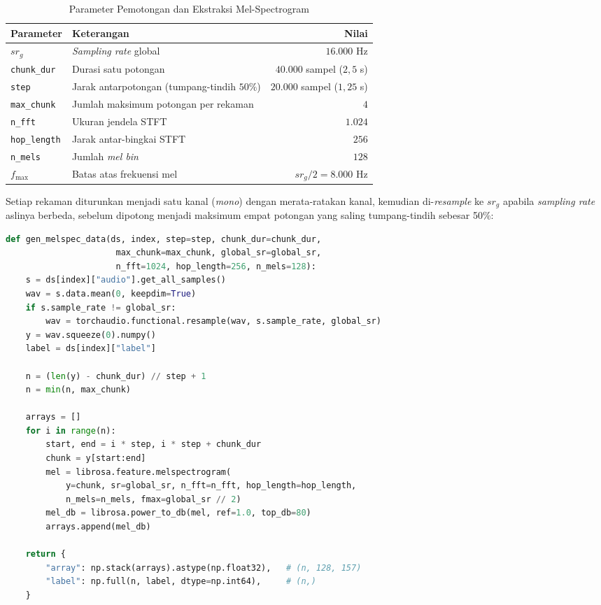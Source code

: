 \begin{table}[htbp]
  \centering
  \caption{Parameter Pemotongan dan Ekstraksi Mel-Spectrogram}
  \label{tab:parameter-pemotongan}
  \begin{tabular}{@{}llr@{}}
    \toprule
    \textbf{Parameter} & \textbf{Keterangan} & \textbf{Nilai} \\
    \midrule
    $sr_g$ & \textit{Sampling rate} global & $16.000$ Hz \\
    \texttt{chunk\_dur} & Durasi satu potongan & $40.000$ sampel ($2{,}5$ s) \\
    \texttt{step} & Jarak antarpotongan (tumpang-tindih $50\%$) & $20.000$ sampel ($1{,}25$ s) \\
    \texttt{max\_chunk} & Jumlah maksimum potongan per rekaman & $4$ \\
    \texttt{n\_fft} & Ukuran jendela STFT & $1.024$ \\
    \texttt{hop\_length} & Jarak antar-bingkai STFT & $256$ \\
    \texttt{n\_mels} & Jumlah \textit{mel bin} & $128$ \\
    $f_{\max}$ & Batas atas frekuensi mel & $sr_g/2 = 8.000$ Hz \\
    \bottomrule
  \end{tabular}
\end{table}

Setiap rekaman diturunkan menjadi satu kanal (\textit{mono}) dengan merata-ratakan
kanal, kemudian di-\textit{resample} ke $sr_g$ apabila \textit{sampling rate}
aslinya berbeda, sebelum dipotong menjadi maksimum empat potongan yang saling
tumpang-tindih sebesar 50\%:

\begin{lstlisting}[language=Python, caption={Fungsi ekstraksi mel-spectrogram per potongan}, label={lst:gen-melspec}]
def gen_melspec_data(ds, index, step=step, chunk_dur=chunk_dur,
                      max_chunk=max_chunk, global_sr=global_sr,
                      n_fft=1024, hop_length=256, n_mels=128):
    s = ds[index]["audio"].get_all_samples()
    wav = s.data.mean(0, keepdim=True)
    if s.sample_rate != global_sr:
        wav = torchaudio.functional.resample(wav, s.sample_rate, global_sr)
    y = wav.squeeze(0).numpy()
    label = ds[index]["label"]

    n = (len(y) - chunk_dur) // step + 1
    n = min(n, max_chunk)

    arrays = []
    for i in range(n):
        start, end = i * step, i * step + chunk_dur
        chunk = y[start:end]
        mel = librosa.feature.melspectrogram(
            y=chunk, sr=global_sr, n_fft=n_fft, hop_length=hop_length,
            n_mels=n_mels, fmax=global_sr // 2)
        mel_db = librosa.power_to_db(mel, ref=1.0, top_db=80)
        arrays.append(mel_db)

    return {
        "array": np.stack(arrays).astype(np.float32),   # (n, 128, 157)
        "label": np.full(n, label, dtype=np.int64),     # (n,)
    }
\end{lstlisting}

